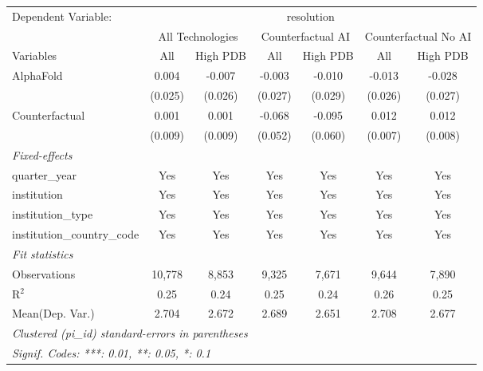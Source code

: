 \begingroup
\centering
\begin{tabular}{lcccccc}
   \tabularnewline \midrule \midrule
   Dependent Variable: & \multicolumn{6}{c}{resolution}\\
 & \multicolumn{2}{c}{All Technologies} & \multicolumn{2}{c}{Counterfactual AI} & \multicolumn{2}{c}{Counterfactual No AI} \\
\cmidrule(lr){1-1}\cmidrule(lr){2-3} \cmidrule(lr){4-5} \cmidrule(lr){6-7}
Variables & \multicolumn{1}{c}{All} & \multicolumn{1}{c}{High PDB} & \multicolumn{1}{c}{All} & \multicolumn{1}{c}{High PDB} & \multicolumn{1}{c}{All} & \multicolumn{1}{c}{High PDB} \\
\cmidrule(lr){1-1}\cmidrule(lr){2-2} \cmidrule(lr){3-3} \cmidrule(lr){4-4} \cmidrule(lr){5-5} \cmidrule(lr){6-6} \cmidrule(lr){7-7}
   AlphaFold                    & 0.004   & -0.007  & -0.003  & -0.010  & -0.013  & -0.028\\   
                                & (0.025) & (0.026) & (0.027) & (0.029) & (0.026) & (0.027)\\   
   Counterfactual               & 0.001   & 0.001   & -0.068  & -0.095  & 0.012   & 0.012\\   
                                & (0.009) & (0.009) & (0.052) & (0.060) & (0.007) & (0.008)\\   
   \midrule
   \emph{Fixed-effects}\\
   quarter\_year                & Yes     & Yes     & Yes     & Yes     & Yes     & Yes\\  
   institution                  & Yes     & Yes     & Yes     & Yes     & Yes     & Yes\\  
   institution\_type            & Yes     & Yes     & Yes     & Yes     & Yes     & Yes\\  
   institution\_country\_code   & Yes     & Yes     & Yes     & Yes     & Yes     & Yes\\  
   \midrule
   \emph{Fit statistics}\\
   Observations                 & 10,778  & 8,853   & 9,325   & 7,671   & 9,644   & 7,890\\  
   R$^2$                        & 0.25    & 0.24    & 0.25    & 0.24    & 0.26    & 0.25\\  
Mean(Dep. Var.) & 2.704 & 2.672 & 2.689 & 2.651 & 2.708 & 2.677 \\
   \midrule \midrule
   \multicolumn{7}{l}{\emph{Clustered (pi\_id) standard-errors in parentheses}}\\
   \multicolumn{7}{l}{\emph{Signif. Codes: ***: 0.01, **: 0.05, *: 0.1}}\\
\end{tabular}
\par\endgroup
